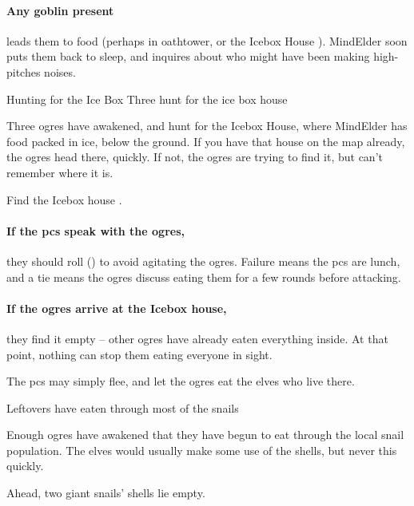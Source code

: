 \begin{multicols}{2}
\paragraph{Any goblin present}
leads them to food (perhaps in \gls{oathtower}, or the Icebox House ).
\Gls{MindElder} soon puts them back to sleep, and inquires about who might have been making high-pitches noises.

{Hunting for the Ice Box}%
{Three  hunt for the ice box house}%
\label{ogresEatIcebox}

Three \glspl{ogre} have awakened, and hunt for the Icebox House, where \gls{MindElder} has food packed in ice, below the ground.
If you have that house on the map already, the \glspl{ogre} head there, quickly.
If not, the \glspl{ogre} are trying to find it, but can't remember where it is.

Find the Icebox house .


\paragraph{If the \glspl{pc} speak with the \glspl{ogre},}
they should roll  (\tn[10]) to avoid agitating the \glspl{ogre}.
Failure means the \glspl{pc} are lunch, and a tie means the \glspl{ogre} discuss eating them for a few \glspl{round} before attacking.

\paragraph{If the \glspl{ogre} arrive at the Icebox house,}
they find it empty -- other \glspl{ogre} have already eaten everything inside.
At that point, nothing can stop them eating everyone in sight.

The \glspl{pc} may simply flee, and let the \glspl{ogre} eat the elves who live there.

{Leftovers}%
{ have eaten through most of the snails}%

Enough \glspl{ogre} have awakened that they have begun to eat through the local snail population.
The elves would usually make some use of the shells, but never this quickly.

\begin{boxtext}
  Ahead, two giant snails' shells lie empty.
\end{boxtext}


\end{multicols}
